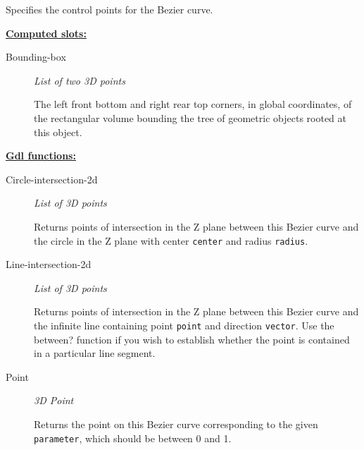 \documentclass [11pt]{book}
\begin{document}
\begin{itemize}
\begin{description}
 Specifies the control points for the Bezier curve.




\end{description}






\textbf{
\underline{Computed slots:}}

\begin{description}

\item [Bounding-box]
\emph{List of two 3D points}

 The left front bottom and right rear top corners, in global coordinates,
of the rectangular volume bounding the tree of geometric objects rooted at this object.




\end{description}






\textbf{
\underline{Gdl functions:}}

\begin{description}

\item [Circle-intersection-2d]
\emph{List of 3D points}

 Returns points of intersection in the Z plane between this Bezier curve and
the circle in the Z plane with center \texttt{center} and radius \texttt{radius}.




\item [Line-intersection-2d]
\emph{List of 3D points}

 Returns points of intersection in the Z plane between this Bezier curve
and the infinite line containing point \texttt{point} and direction \texttt{vector}. Use the
between? function if you wish to establish whether the point is contained in a particular line
segment.




\item [Point]
\emph{3D Point}

 Returns the point on this Bezier curve corresponding to the given \texttt{parameter},
which should be between 0 and 1.




\end{description}








\end{itemize}
\end{document}
